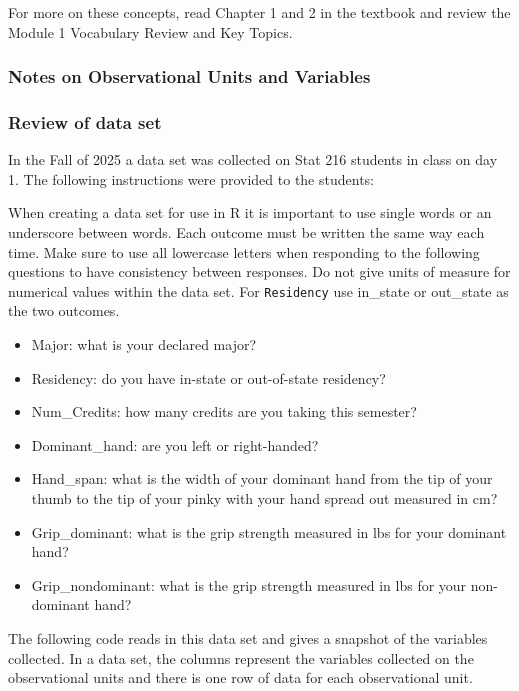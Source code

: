 \documentclass[
]{report}
\begin{document}
For more on these concepts, read Chapter 1 and 2 in the textbook and review the Module 1 Vocabulary Review and Key Topics.

\subsubsection*{Notes on Observational Units and Variables}\label{notes-on-observational-units-and-variables}

\newpage

\subsubsection*{Review of data set}\label{review-of-data-set}

In the Fall of 2025 a data set was collected on Stat 216 students in class on day 1. The following instructions were provided to the students:

When creating a data set for use in R it is important to use single words or an underscore between words. Each outcome must be written the same way each time. Make sure to use all lowercase letters when responding to the following questions to have consistency between responses. Do not give units of measure for numerical values within the data set. For \texttt{Residency} use in\_state or out\_state as the two outcomes.

\begin{itemize}
\item
  Major: what is your declared major?
\item
  Residency: do you have in-state or out-of-state residency?
\item
  Num\_Credits: how many credits are you taking this semester?
\item
  Dominant\_hand: are you left or right-handed?
\item
  Hand\_span: what is the width of your dominant hand from the tip of your thumb to the tip of your pinky with your hand spread out measured in cm?
\item
  Grip\_dominant: what is the grip strength measured in lbs for your dominant hand?
\item
  Grip\_nondominant: what is the grip strength measured in lbs for your non-dominant hand?
\end{itemize}

The following code reads in this data set and gives a snapshot of the variables collected. In a data set, the columns represent the variables collected on the observational units and there is one row of data for each observational unit.
\end{document}
